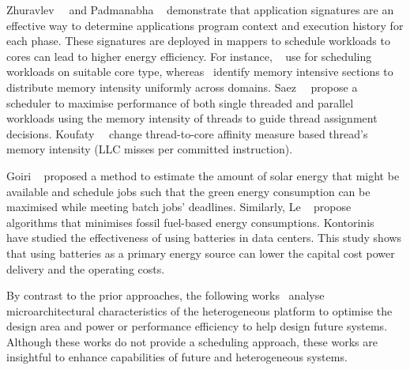 Zhuravlev~\etal~\citep{Zhuravlev:2012:SST:2379776.2379780} and Padmanabha
\etal~\citep{Padmanabha:2013:TBP:2540708.2540746} demonstrate that application signatures
are an effective way to determine applications program context and execution history for
each phase. These signatures are deployed in mappers to schedule workloads to cores can
lead to higher energy efficiency. For instance,
~\citep{Padmanabha:2013:TBP:2540708.2540746} use for scheduling workloads on suitable core
type, whereas~\citep{Zhuravlev:2012:SST:2379776.2379780} identify memory intensive
sections to distribute memory intensity uniformly across domains.
Saez~\etal~\citep{Saez:2010:CSA:1755913.1755929} propose a scheduler to maximise
performance of both single threaded and parallel workloads using the memory intensity of
threads to guide thread assignment decisions.
Koufaty~\etal~\citep{Koufaty:2010:BSH:1755913.1755928} change thread-to-core affinity
measure based thread's memory intensity (LLC misses per committed instruction).

Goiri \etal~\citep{6114408} proposed a method to estimate the amount of solar energy
that might be available and schedule jobs such that the green energy consumption can be
maximised while meeting batch jobs' deadlines.  Similarly, Le \etal~\citep{5598305}
propose algorithms that minimises fossil fuel-based energy consumptions.
Kontorinis \etal~\citep{Kontorinis:2012:MDU:2366231.2337216} have studied the effectiveness of using batteries in data centers. This study shows that using batteries as a primary energy source can lower the capital cost power delivery and the operating costs.


By contrast to the prior approaches, the following
works~\citep{Kumar:2006:CAO:1152154.1152162, Gupta:2011:ASP:1945023.1945026,
Fedorova:2009:MPE:1610252.1610270} analyse microarchitectural characteristics of the
heterogeneous platform to optimise the design area and power or performance efficiency to
help design future \muc systems. Although these works do not provide a scheduling
approach, these works are insightful to enhance capabilities of future \muc and
heterogeneous \muc systems.
